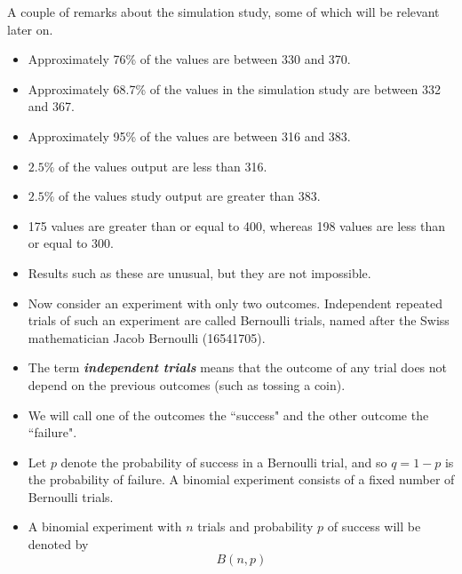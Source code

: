 \documentclass[]{report}
\begin{document}
	
	A couple of remarks about the simulation study, some of which will be relevant later on.
	\begin{itemize}
		\item Approximately 76\% of the values are between 330 and 370.
		\item Approximately 68.7\% of the values in the simulation study are between 332 and 367.
		\item Approximately 95\% of the values are between 316 and 383.
		\item $2.5\%$ of the values output are less than 316.
		\item $2.5\%$ of the values study output are greater than 383.
		\item 175 values are greater than or equal to 400, whereas 198 values are less than or equal to 300.
		\item Results such as these are unusual, but they are not impossible.
	\end{itemize}
	
	
	
	
	
	
	
	
	\begin{itemize}
		\item Now consider an experiment with only two outcomes. Independent repeated trials of such an experiment are
		called Bernoulli trials, named after the Swiss mathematician Jacob Bernoulli (16541705). \item The term \textbf{\emph{independent
				trials}} means that the outcome of any trial does not depend on the previous outcomes (such as tossing a coin).
		\item We will call one of the outcomes the ``success" and the other outcome the ``failure".
	\end{itemize}
	
	
	
	\begin{itemize} \item
		Let $p$ denote the probability of success in a Bernoulli trial, and so $q = 1 - p$ is the probability of failure.
		A binomial experiment consists of a fixed number of Bernoulli trials. \item A binomial experiment with $n$ trials and
		probability $p$ of success will be denoted by
		\[B(n, p)\]
	\end{itemize}
	
\end{document}
